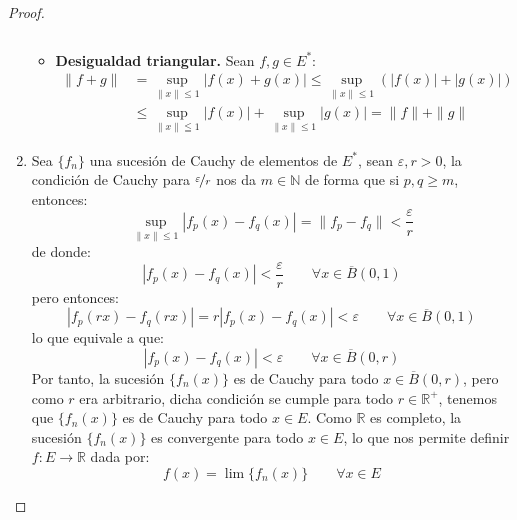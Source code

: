 \begin{prop}
\begin{proof}
\begin{enumerate}
\begin{itemize}
\begin{equation*}
                        \end{equation*}
                    \item \textbf{Desigualdad triangular.} Sean $f,g\in E^\ast$:
                        \begin{align*}
                            \|f+g\| &= \sup_{\|x\|\leq 1}|f(x) + g(x)| \leq \sup_{\|x\|\leq 1} (|f(x)| + |g(x)|) \\ &\leq \sup_{\|x\|\leqq 1}|f(x)| + \sup_{\|x\|\leq 1} |g(x)| = \|f\| + \|g\|
                        \end{align*}
                \end{itemize}
            \item Sea $\{f_n\}$ una sucesión de Cauchy de elementos de $E^\ast$, sean $\varepsilon,r>0$, la condición de Cauchy para $\nicefrac{\varepsilon}{r}$ nos da $m\in \mathbb{N}$ de forma que si $p,q\geq m$, entonces:
                \begin{equation*}
                    \sup_{\|x\|\leq 1} |f_p(x) - f_q(x)| = \|f_p - f_q\| < \dfrac{\varepsilon}{r}
                \end{equation*}
                de donde:
                \begin{equation*}
                    |f_p(x) - f_q(x)| < \dfrac{\varepsilon}{r}\qquad \forall x\in \overline{B}(0,1)
                \end{equation*}
                pero entonces:
                \begin{equation*}
                    |f_p(rx) - f_q(rx)| = r|f_p(x) - f_q(x)| < \varepsilon \qquad \forall x\in \overline{B}(0,1)
                \end{equation*}
                lo que equivale a que:
                \begin{equation*}
                    |f_p(x) - f_q(x)| < \varepsilon\qquad \forall x\in \overline{B}(0,r)
                \end{equation*}
                Por tanto, la sucesión $\{f_n(x)\}$ es de Cauchy para todo $x\in \overline{B}(0,r)$, pero como $r$ era arbitrario, dicha condición se cumple para todo $r\in \mathbb{R}^+$, tenemos que $\{f_n(x)\}$ es de Cauchy para todo $x\in E$. Como $\mathbb{R}$ es completo, la sucesión $\{f_n(x)\}$ es convergente para todo $x\in E$, lo que nos permite definir $f:E\to \mathbb{R}$ dada por:
                \begin{equation*}
                    f(x) = \lim \{f_n(x)\} \qquad \forall x\in E
                \end{equation*}

\end{enumerate}
\end{proof}
\end{prop}

